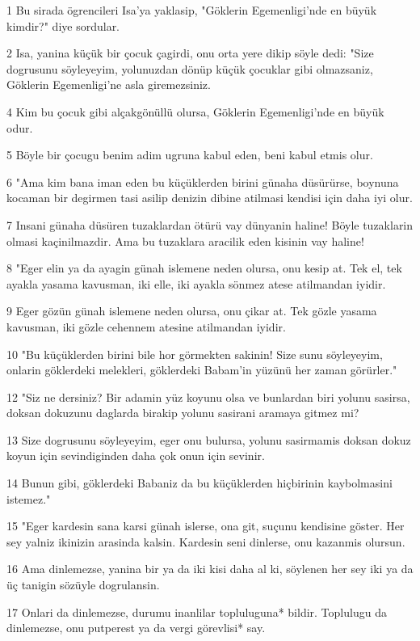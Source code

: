 \par 1 Bu sirada ögrencileri Isa'ya yaklasip, "Göklerin Egemenligi'nde en büyük kimdir?" diye sordular.
\par 2 Isa, yanina küçük bir çocuk çagirdi, onu orta yere dikip söyle dedi: "Size dogrusunu söyleyeyim, yolunuzdan dönüp küçük çocuklar gibi olmazsaniz, Göklerin Egemenligi'ne asla giremezsiniz.
\par 4 Kim bu çocuk gibi alçakgönüllü olursa, Göklerin Egemenligi'nde en büyük odur.
\par 5 Böyle bir çocugu benim adim ugruna kabul eden, beni kabul etmis olur.
\par 6 "Ama kim bana iman eden bu küçüklerden birini günaha düsürürse, boynuna kocaman bir degirmen tasi asilip denizin dibine atilmasi kendisi için daha iyi olur.
\par 7 Insani günaha düsüren tuzaklardan ötürü vay dünyanin haline! Böyle tuzaklarin olmasi kaçinilmazdir. Ama bu tuzaklara aracilik eden kisinin vay haline!
\par 8 "Eger elin ya da ayagin günah islemene neden olursa, onu kesip at. Tek el, tek ayakla yasama kavusman, iki elle, iki ayakla sönmez atese atilmandan iyidir.
\par 9 Eger gözün günah islemene neden olursa, onu çikar at. Tek gözle yasama kavusman, iki gözle cehennem atesine atilmandan iyidir.
\par 10 "Bu küçüklerden birini bile hor görmekten sakinin! Size sunu söyleyeyim, onlarin göklerdeki melekleri, göklerdeki Babam'in yüzünü her zaman görürler."
\par 12 "Siz ne dersiniz? Bir adamin yüz koyunu olsa ve bunlardan biri yolunu sasirsa, doksan dokuzunu daglarda birakip yolunu sasirani aramaya gitmez mi?
\par 13 Size dogrusunu söyleyeyim, eger onu bulursa, yolunu sasirmamis doksan dokuz koyun için sevindiginden daha çok onun için sevinir.
\par 14 Bunun gibi, göklerdeki Babaniz da bu küçüklerden hiçbirinin kaybolmasini istemez."
\par 15 "Eger kardesin sana karsi günah islerse, ona git, suçunu kendisine göster. Her sey yalniz ikinizin arasinda kalsin. Kardesin seni dinlerse, onu kazanmis olursun.
\par 16 Ama dinlemezse, yanina bir ya da iki kisi daha al ki, söylenen her sey iki ya da üç tanigin sözüyle dogrulansin.
\par 17 Onlari da dinlemezse, durumu inanlilar topluluguna* bildir. Toplulugu da dinlemezse, onu putperest ya da vergi görevlisi* say.

